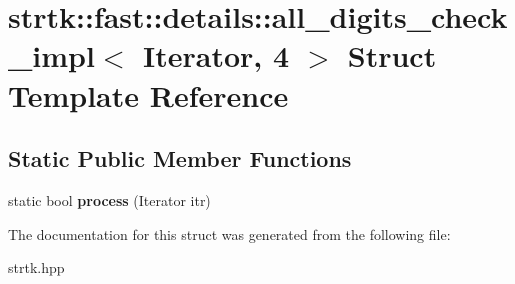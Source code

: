 \hypertarget{structstrtk_1_1fast_1_1details_1_1all__digits__check__impl_3_01Iterator_00_014_01_4}{\section{strtk\-:\-:fast\-:\-:details\-:\-:all\-\_\-digits\-\_\-check\-\_\-impl$<$ Iterator, 4 $>$ Struct Template Reference}
\label{structstrtk_1_1fast_1_1details_1_1all__digits__check__impl_3_01Iterator_00_014_01_4}
}
\subsection*{Static Public Member Functions}
\begin{DoxyCompactItemize}
\item 
\hypertarget{structstrtk_1_1fast_1_1details_1_1all__digits__check__impl_3_01Iterator_00_014_01_4_ad150805ccb69a09469533d46e8999e47}{static bool {\bfseries process} (Iterator itr)}\label{structstrtk_1_1fast_1_1details_1_1all__digits__check__impl_3_01Iterator_00_014_01_4_ad150805ccb69a09469533d46e8999e47}

\end{DoxyCompactItemize}


The documentation for this struct was generated from the following file\-:\begin{DoxyCompactItemize}
\item 
strtk.\-hpp\end{DoxyCompactItemize}

